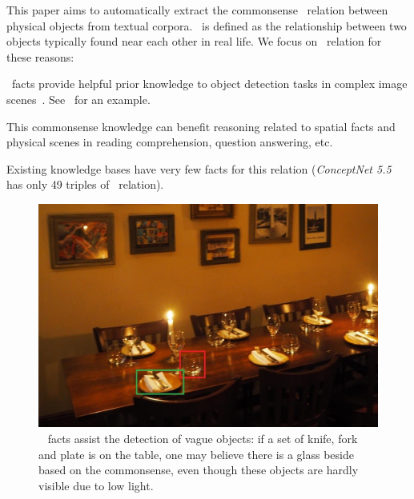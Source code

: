 This paper aims to automatically extract the commonsense \lnear\ relation between
physical objects from textual corpora. \lnear\ is defined as the relationship between two objects typically found near each other in real life.
We focus on \lnear\ relation for these reasons:  
\begin{compactenum}
	\item \lnear\ facts provide helpful prior knowledge to object detection tasks in complex image scenes~\cite{yatskar2016stating}. See~ for an example.
	\item This commonsense knowledge can benefit  reasoning related to spatial facts and physical scenes in reading comprehension,
	question answering, etc.~\cite{li2016commonsense}
	\item Existing knowledge bases have very few facts for	this relation (\textit{ConceptNet 5.5} has only 49 triples of \lnear\ relation).
\end{compactenum}
\begin{figure}[t]
	\centering
	\includegraphics[width=0.99\columnwidth]{dim-table.jpg}
	\caption{\lnear~ facts assist the detection of vague objects: if a set of knife, fork and plate is on the table, one may believe there is a glass beside based on the commonsense, 
	even though these objects are hardly visible due to low light.}
	\label{fig:dim}
\end{figure}
